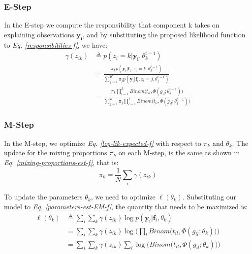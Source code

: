 \subsubsection{E-Step}
In the E-step we compute the responsibility that component k takes on explaining observations $\mathbf{y_{i}}$, and by substituting the proposed likelihood function to \emph{Eq. \ref{responsibilities-f}}, we have:
\begin{equation} \label{responsibilities-model-f}
  \begin{split}
	\gamma(z_{ik}) & \triangleq p(z_{i}=k|\mathbf{y_{i}},\theta_{k}^{t-1}) \\
				   & = \frac{\pi_{k}p(\mathbf{y}_{i}|\mathbf{f}_{i},z_{i}=k,\theta_{k}^{t-1})}{\sum\limits_{j=1}^{K} \pi_{j}p(\mathbf{y}_{i}|\mathbf{f}_{i},z_{i}=j,\theta_{j}^{t-1})} \\
				   & = \frac{\pi_{k} \prod\limits_{l=1}^{L} Binom \big(t_{il}, \Phi(g_{il}; \theta_{k}^{t-1})\big)} {\sum\limits_{j=1}^{K} \pi_{j} \prod\limits_{l=1}^{L} Binom \big(t_{il}, \Phi(g_{il}; \theta_{j}^{t-1})\big)}
  \end{split}
\end{equation}

\subsubsection{M-Step}
In the M-step, we optimize \emph{Eq. \ref{log-lik-expected-f}} with respect to $\pi_{k}$ and $\theta_{k}$. The update for the mixing proportions $\pi_{k}$ on each M-step, is the same as shown in \emph{Eq. \ref{mixing-proportions-est-f}}, that is:
\begin{equation} \label{mixing-proportions-est2-f}
		\pi_{k} = \frac{1}{N} \sum_{i} \gamma(z_{ik})
\end{equation}

To update the parameters $\theta_{k}$, we need to optimize $\ell(\theta_{k})$. Substituting our model to \emph{Eq. \ref{parameters-est-EM-f}}, the quantity that needs to be maximized is:
\begin{equation} \label{parameters-est2-EM-f}
  \begin{split}
	\ell(\theta_{k}) & \triangleq \sum_{i} \sum_{k} \gamma(z_{ik}) \log p(\mathbf{y}_{i}|\mathbf{f}_{i}, \theta_{k}) \\
					 & = \sum_{i} \sum_{k} \gamma(z_{ik}) \log \bigg( \prod_{l} Binom \big(t_{il}, \Phi(g_{il}; \theta_{k})\big) \bigg)\\
					 & = \sum_{i} \sum_{k} \gamma(z_{ik}) \sum_{l} \log \bigg(Binom \big(t_{il}, \Phi(g_{il}; \theta_{k})\big) \bigg)
  \end{split}
\end{equation}


